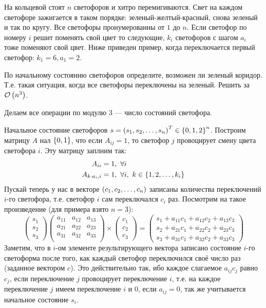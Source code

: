\begin{task}[3]
На кольцевой стоят $n$ светофоров и хитро перемигиваются. Свет на каждом светофоре зажигается в таком порядке: зеленый-желтый-красный, снова зеленый и так по кругу. Все светофоры пронумерованны от $1$ до $n$. Если светофор по номеру $i$ решит поменять свой цвет то следующие, $k_i$ светофоров с шагом $a_i$ тоже поменяют свой цвет. Ниже приведен пример, когда переключается первый светофор: $k_1 = 6, a_1 = 2$. 

По начальному состоянию светофоров определите, возможен ли зеленый коридор. Т.е. такая ситуация, когда все светофоры переключены на зеленый. Решить за $\mathcal{O}\left(n^3\right)$.
\end{task}
\begin{solution}
Делаем все операции по модулю $3$ --- число состояний светофора.

Начальное состояние светофоров $s = \left( s_1, s_2, \ldots, s_n \right)^T \in \left\lbrace 0,1,2 \right\rbrace^n$. Построим матрицу $A$ нал $\left\lbrace 0, 1 \right\rbrace$, что если $A_{ij} = 1$, то светофор $j$ провоцирует смену цвета светофора $i$. Эту матрицу заплним так:
\begin{align*}
	A_{ii} &= 1,\ \forall i\\
	A_{k\cdot a_i, i} &= 1,\ \forall i,\ k \in \left\lbrace 1, 2, \ldots, k_i \right\rbrace
\end{align*}
Пускай теперь у нас в векторе $\left( c_1, c_2, \ldots, c_n \right)$ записаны количества переключений $i$-го светофора, т.е. светофор $i$ сам переключался $c_i$ раз. Посмотрим на такое произведение (для примера взято $n = 3$): 
\[
	\begin{pmatrix}
		s_1\\
		s_2\\
		s_3
	\end{pmatrix} 
	\begin{pmatrix}
		a_{11} & a_{12} & a_{13} \\
		a_{21} & a_{22} & a_{23} \\
		a_{31} & a_{32} & a_{33} \\
	\end{pmatrix}
	\times
	\begin{pmatrix}
		c_1\\
		c_2\\
		c_3
	\end{pmatrix}
	=
	\begin{pmatrix}
		s_1 + a_{11}c_1 + a_{12}c_2 + a_{13}c_3\\
		s_2 + a_{21}c_1 + a_{22}c_2 + a_{23}c_3\\
		s_3 + a_{31}c_1 + a_{32}c_2 + a_{33}c_3
	\end{pmatrix}
\]
Заметим, что в $i$-ом элементе результирующего вектора записано состояние $i$-го светоформа после того, как каждый светофор переключился своё число раз (заданное вектором $c$). Это действительно так, ибо каждое слагаемое $a_{ij}c_j$ равно $c_j$, если переключение $j$ провоцирует переключение $i$, т.е. на каждое переключение $j$ имеем переключение $i$ и $0$, если $a_{ij} = 0$, так же учитывается начальное состояние $s_i$. 


\end{solution}

